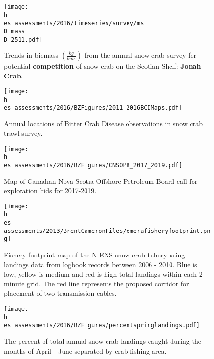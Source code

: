 \documentclass[11pt]{article}
\newcommand{\D}{.}
\newcommand{\h}{\string~/}
\newcommand{\es}{bio.data/bio.snowcrab/}
\begin{document}
\begin{figure}
\centering
\texttt{[image: \\h \\es assessments/2016/timeseries/survey/ms\\D mass\\D 2511.pdf]}


\caption{Trends in biomass $\left(\tfrac{kg}{km^2}\right)$ from the annual snow crab survey for potential \textbf{competition} of snow crab on the Scotian Shelf: \textbf{Jonah Crab}.  }
\end{figure}

\clearpage

\begin{figure}
\centering
\texttt{[image: \\h \\es assessments/2016/BZFigures/2011-2016BCDMaps.pdf]}
\caption{Annual locations of Bitter Crab Disease observations in snow crab trawl survey.}
\end{figure}



%


\begin{figure}
\centering
\texttt{[image: \\h \\es assessments/2016/BZFigures/CNSOPB\_2017\_2019.pdf]}
\caption{Map of Canadian Nova Scotia Offshore Petroleum Board call for exploration bids for 2017-2019. }
\end{figure}
\clearpage

\begin{figure}
\centering
\texttt{[image: \\h \\es assessments/2013/BrentCameronFiles/emerafisheryfootprint.png]}
\caption{Fishery footprint map of the N-ENS snow crab fishery using landings data from logbook records between 2006 - 2010. Blue is low, yellow is medium and red is high total landings within each 2 minute grid. The red line represents the proposed corridor for placement of two transmission cables.  }
\end{figure}
\clearpage

\begin{figure}
\centering
\texttt{[image: \\h \\es assessments/2016/BZFigures/percentspringlandings.pdf]}
\caption{The percent of total annual snow crab landings caught during the months of April - June separated by crab fishing area.}
\end{figure}
\clearpage
\end{document}
